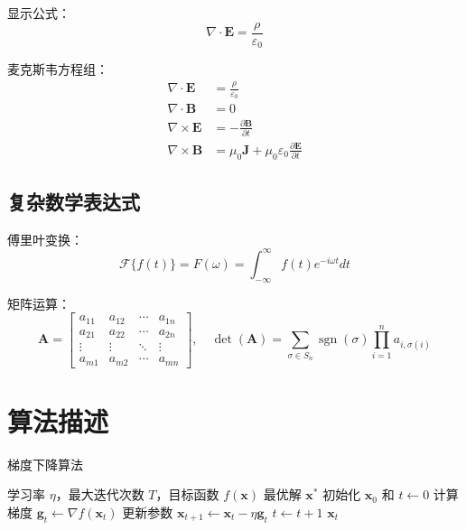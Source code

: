 显示公式：
\begin{equation}
    \nabla \cdot \mathbf{E} = \frac{\rho}{\varepsilon_0}
\end{equation}

麦克斯韦方程组：
\begin{align}
    \nabla \cdot \mathbf{E} &= \frac{\rho}{\varepsilon_0} \\
    \nabla \cdot \mathbf{B} &= 0 \\
    \nabla \times \mathbf{E} &= -\frac{\partial \mathbf{B}}{\partial t} \\
    \nabla \times \mathbf{B} &= \mu_0\mathbf{J} + \mu_0\varepsilon_0\frac{\partial \mathbf{E}}{\partial t}
\end{align}

\subsection{复杂数学表达式}

傅里叶变换：
\begin{equation}
    \mathcal{F}\{f(t)\} = F(\omega) = \int_{-\infty}^{\infty} f(t) e^{-i\omega t} dt
\end{equation}

矩阵运算：
\begin{equation}
    \mathbf{A} = \begin{bmatrix}
        a_{11} & a_{12} & \cdots & a_{1n} \\
        a_{21} & a_{22} & \cdots & a_{2n} \\
        \vdots & \vdots & \ddots & \vdots \\
        a_{m1} & a_{m2} & \cdots & a_{mn}
    \end{bmatrix}, \quad
    \det(\mathbf{A}) = \sum_{\sigma \in S_n} \operatorname{sgn}(\sigma) \prod_{i=1}^n a_{i,\sigma(i)}
\end{equation}

\clearpage
\section{算法描述}
\label{sec:algorithms}

\begin{algorithm}
\caption{梯度下降算法}
\label{alg:gradient_descent}
\begin{algorithmic}[1]
\Require 学习率 $\eta$，最大迭代次数 $T$，目标函数 $f(\mathbf{x})$
\Ensure 最优解 $\mathbf{x}^*$
\State 初始化 $\mathbf{x}_0$ 和 $t \leftarrow 0$
    \State 计算梯度 $\mathbf{g}_t \leftarrow \nabla f(\mathbf{x}_t)$
    \State 更新参数 $\mathbf{x}_{t+1} \leftarrow \mathbf{x}_t - \eta \mathbf{g}_t$
    \State $t \leftarrow t + 1$
\EndWhile
\State \Return $\mathbf{x}_t$
\end{algorithmic}
\end{algorithm}

